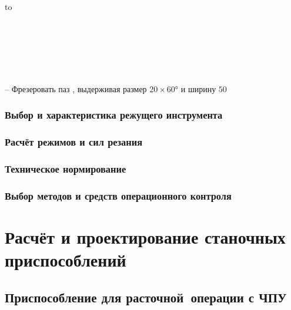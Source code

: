 \documentclass[14pt,russian,a4paper]{extreport}
\newcommand*\circled[1]{\tikz[baseline=(char.base)]{
             \node[shape=circle,draw,inner sep=2pt, minimum size=8mm] (char) {#1};}}
\begin{document}
\begin{table}[H]
  \setlength{\tabulinesep}{1.2ex}
  \begin{longtabu} to \textwidth { | X[7,l,p] | }
    \caption{Содержание основных переходов операции 045} \label{tab:045} \\
  
      \hline 
       \\ \hline 
    \endfirsthead
  
       \\ \hline 
       \\ \hline
    \endhead
  
      \hline
    \endfoot

      -- Фрезеровать паз \circled{34}, выдерживая размер $20 \times \ang{60}$ и ширину $50$ \\ \hline

  \end{longtabu}
\end{table}

\subsection{Выбор и характеристика режущего инструмента}




\subsection{Расчёт режимов и сил резания}
\subsection{Техническое нормирование}
\subsection{Выбор методов и средств операционного контроля}


\chapter{Расчёт и проектирование станочных приспособлений}

\section{Приспособление для расточной операции с ЧПУ}
\end{document}
